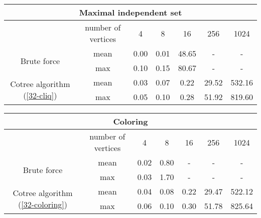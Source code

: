 \begin{center}
    \begin{tabular}{|c|c|c|c|c|c|c|}
        \hline
        \multicolumn{7}{|c|}{Maximal independent set}                                                                 \\
        \hline
                                                          & number of vertices & 4    & 8    & 16    & 256   & 1024   \\
        \hline

        \multirow{2}{*}{Brute force}                      & mean               & 0.00 & 0.01 & 48.65 & -     & -      \\
                                                          & max                & 0.10 & 0.15 & 80.67 & -     & -      \\
        \hline
        \multirow{2}{*}{Cotree algorithm (\ref{32-cliq})} & mean               & 0.03 & 0.07 & 0.22  & 29.52 & 532.16 \\
                                                          & max                & 0.05 & 0.10 & 0.28  & 51.92 & 819.60 \\
        \hline
    \end{tabular}
\end{center}


\begin{center}
    \begin{tabular}{|c|c|c|c|c|c|c|}
        \hline
        \multicolumn{7}{|c|}{Coloring}                                                                                   \\
        \hline
                                                              & number of vertices & 4    & 8    & 16   & 256   & 1024   \\
        \hline

        \multirow{2}{*}{Brute force}                          & mean               & 0.02 & 0.80 & -    & -     & -      \\
                                                              & max                & 0.03 & 1.70 & -    & -     & -      \\
        \hline
        \multirow{2}{*}{Cotree algorithm (\ref{32-coloring})} & mean               & 0.04 & 0.08 & 0.22 & 29.47 & 522.12 \\
                                                              & max                & 0.06 & 0.10 & 0.30 & 51.78 & 825.64 \\
        \hline
    \end{tabular}
\end{center}

